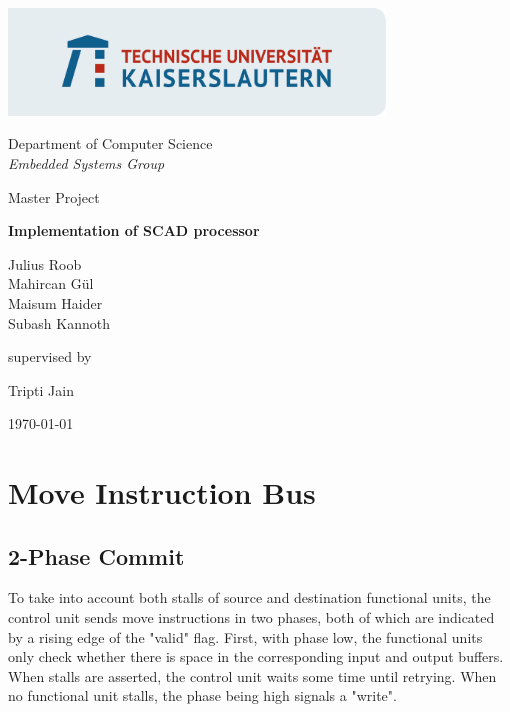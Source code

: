 \documentclass[adraft]{eptcs}
\begin{document}
\begin{titlepage}
	\title{}
	\centering
	\includegraphics[width=0.75\textwidth]{TUKL_LOGO_FELD_LINKS_RGB}\par\vspace{1cm}
	{\Large Department of Computer Science \\ \it Embedded Systems Group \par}
	\vspace{1cm}
	{\Large Master Project\par}
	\vspace{1.5cm}
	{\huge\bfseries Implementation of SCAD processor \par}
	\vspace{2cm}
	{\Large Julius Roob \\ Mahircan G{\"u}l \\ Maisum Haider \\ Subash Kannoth \par}
	\vfill
	supervised by\par
	\Large{Tripti Jain}
	\vfill
	{\large \today\par}
\end{titlepage}

	 \newpage
	\tableofcontents \newpage
	\listoftodos \newpage
	
	
	
	\section{Move Instruction Bus}
		\subsection{2-Phase Commit}
			To take into account both stalls of source and destination functional units, the control unit sends move instructions in two phases, both of which are indicated by a rising edge of the "valid" flag.%
			First, with phase low, the functional units only check whether there is space in the corresponding input and output buffers.
			When stalls are asserted, the control unit waits some time until retrying.
			When no functional unit stalls, the phase being high signals a "write".
			
\end{document}
